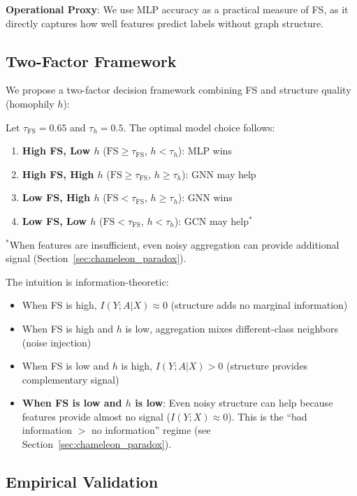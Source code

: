 \textbf{Operational Proxy}: We use MLP accuracy as a practical measure of FS, as it directly captures how well features predict labels without graph structure.

\subsection{Two-Factor Framework}

We propose a two-factor decision framework combining FS and structure quality (homophily $h$):

\begin{proposition}
\label{prop:two_factor}
Let $\tau_{\text{FS}} = 0.65$ and $\tau_h = 0.5$. The optimal model choice follows:
\begin{enumerate}
    \item \textbf{High FS, Low $h$} ($\text{FS} \geq \tau_{\text{FS}}$, $h < \tau_h$): MLP wins
    \item \textbf{High FS, High $h$} ($\text{FS} \geq \tau_{\text{FS}}$, $h \geq \tau_h$): GNN may help
    \item \textbf{Low FS, High $h$} ($\text{FS} < \tau_{\text{FS}}$, $h \geq \tau_h$): GNN wins
    \item \textbf{Low FS, Low $h$} ($\text{FS} < \tau_{\text{FS}}$, $h < \tau_h$): GCN may help$^*$
\end{enumerate}
$^*$When features are insufficient, even noisy aggregation can provide additional signal (Section~\ref{sec:chameleon_paradox}).
\end{proposition}

The intuition is information-theoretic:
\begin{itemize}
    \item When FS is high, $I(Y; A | X) \approx 0$ (structure adds no marginal information)
    \item When FS is high and $h$ is low, aggregation mixes different-class neighbors (noise injection)
    \item When FS is low and $h$ is high, $I(Y; A | X) > 0$ (structure provides complementary signal)
    \item \textbf{When FS is low and $h$ is low}: Even noisy structure can help because features provide almost no signal ($I(Y; X) \approx 0$). This is the ``bad information $>$ no information'' regime (see Section~\ref{sec:chameleon_paradox}).
\end{itemize}

\subsection{Empirical Validation}

